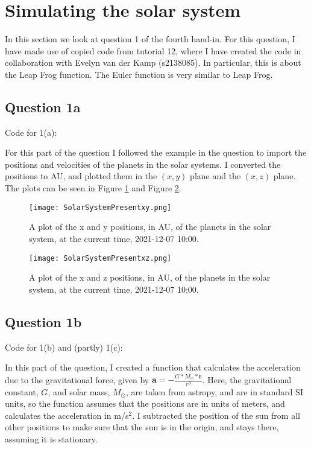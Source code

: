 \section{Simulating the solar system}

In this section we look at question 1 of the fourth hand-in. 
For this question, I have made use of copied code from tutorial 12, where I have created the code in collaboration with Evelyn van der Kamp (s2138085). 
In particular, this is about the Leap Frog function. The Euler function is very similar to Leap Frog.

\subsection{Question 1a}

Code for 1(a):


For this part of the question I followed the example in the question to import the positions and velocities of the planets in the solar systems.
I converted the positions to AU, and plotted them in the $(x,y)$ plane and the $(x,z)$ plane.
The plots can be seen in Figure \ref{fig:SSxy} and Figure \ref{fig:SSxz}.

\begin{figure}[ht!]
  \centering
  \texttt{[image: SolarSystemPresentxy.png]}
  \caption{A plot of the x and y positions, in AU, of the planets in the solar system, at the current time, 2021-12-07 10:00.}
  \label{fig:SSxy}
\end{figure}

\begin{figure}[ht!]
  \centering
  \texttt{[image: SolarSystemPresentxz.png]}
  \caption{A plot of the x and z positions, in AU, of the planets in the solar system, at the current time, 2021-12-07 10:00.}
  \label{fig:SSxz}
\end{figure}

\subsection{Question 1b}

Code for 1(b) and (partly) 1(c):


In this part of the question, I created a function that calculates the acceleration due to the gravitational force, given by $\textbf{a} = -\frac{G*M_{\odot}*\textbf{r}}{r^3}$.
Here, the gravitational constant, $G$, and solar mass, $M_{\odot}$, are taken from astropy, and are in standard SI units, so the function assumes that the positions are in units of meters, and calculates the acceleration in m/s$^2$.
I subtracted the position of the sun from all other positions to make sure that the sun is in the origin, and stays there, assuming it is stationary.

